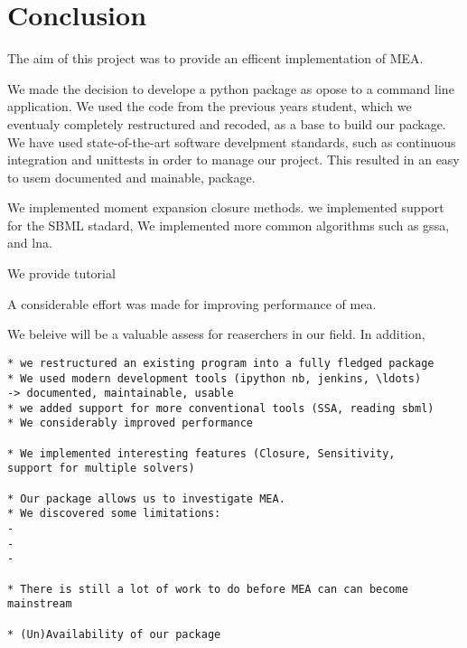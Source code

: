 \section{Conclusion} \label{sec:conclus}

The aim of this project was to provide an efficent \py{} implementation of \acrlong{MEA}.

We made the decision to develope a python package as opose to a command line application.
We used the code from the previous years student, which we eventualy completely restructured and recoded, as a base to build our package.
We have used state-of-the-art software develpment standards, such as continuous integration and unittests in order to manage our project.
This resulted in an easy to usem documented and mainable, package.

We implemented moment expansion closure methods.
we implemented support for the SBML stadard,
We implemented more common algorithms such as \gls{gssa}, and \gls{lna}.

We provide tutorial

A considerable effort was made for improving performance of \gls{mea}.


We beleive \means{} will be a valuable assess for reaserchers in our field. In addition, 
 


\begin{verbatim}
* we restructured an existing program into a fully fledged package
* We used modern development tools (ipython nb, jenkins, \ldots)
-> documented, maintainable, usable
* we added support for more conventional tools (SSA, reading sbml)
* We considerably improved performance

* We implemented interesting features (Closure, Sensitivity,
support for multiple solvers)

* Our package allows us to investigate MEA.
* We discovered some limitations:
-
-
-

* There is still a lot of work to do before MEA can can become mainstream

* (Un)Availability of our package

\end{verbatim}

